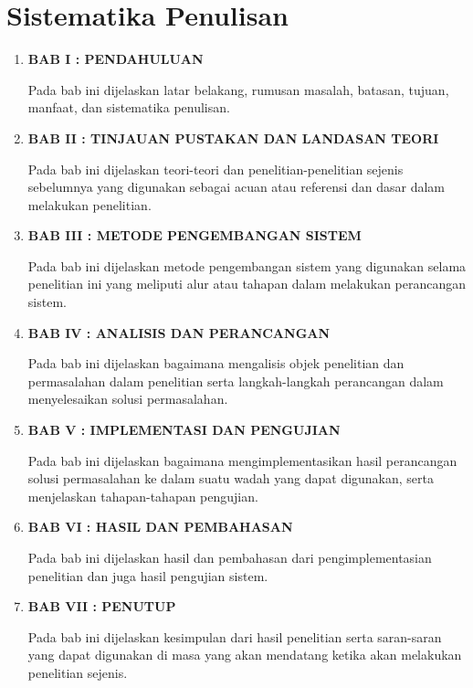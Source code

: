 \section{Sistematika Penulisan}
\begin{enumerate}
    \itemsep0em
    \item \textbf{BAB I : PENDAHULUAN}
    
    Pada bab ini dijelaskan latar belakang, rumusan masalah, batasan, tujuan, manfaat, dan sistematika penulisan.
    \item \textbf{BAB II : TINJAUAN PUSTAKAN DAN LANDASAN TEORI}
    
    Pada bab ini dijelaskan teori-teori dan penelitian-penelitian sejenis sebelumnya yang digunakan sebagai acuan atau referensi dan dasar dalam melakukan penelitian.
    \item \textbf{BAB III : METODE PENGEMBANGAN SISTEM}
    
    Pada bab ini dijelaskan metode pengembangan sistem yang digunakan selama penelitian ini yang meliputi alur atau tahapan dalam melakukan perancangan sistem.
    \item \textbf{BAB IV : ANALISIS DAN PERANCANGAN}
    
    Pada bab ini dijelaskan bagaimana mengalisis objek penelitian dan permasalahan dalam penelitian serta langkah-langkah perancangan dalam menyelesaikan solusi permasalahan.
    \item \textbf{BAB V : IMPLEMENTASI DAN PENGUJIAN}
    
    Pada bab ini dijelaskan bagaimana mengimplementasikan hasil perancangan solusi permasalahan ke dalam suatu wadah yang dapat digunakan, serta menjelaskan tahapan-tahapan pengujian.
    \item \textbf{BAB VI : HASIL DAN PEMBAHASAN}
    
    Pada bab ini dijelaskan hasil dan pembahasan dari pengimplementasian penelitian dan juga hasil pengujian sistem.
    \item \textbf{BAB VII : PENUTUP}
    
    Pada bab ini dijelaskan kesimpulan dari hasil penelitian serta saran-saran yang dapat digunakan di masa yang akan mendatang ketika akan melakukan penelitian sejenis.
\end{enumerate}

\begin{comment}

\end{comment}
